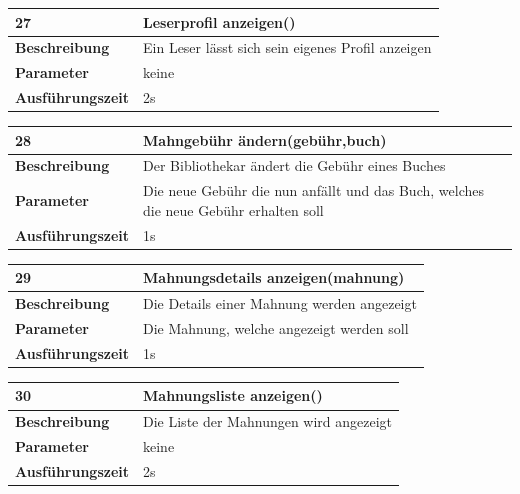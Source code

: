\documentclass[fontsize=12pt,paper=a4,twoside]{scrartcl}
\begin{document}
\begin{table}
	[H] \label{a27} 
	\begin{tabular}
		{|l|p{10cm}|} \hline \textbf{27} & \textbf{Leserprofil anzeigen()} \\
		\hline \textbf{Beschreibung} & Ein Leser lässt sich sein eigenes Profil anzeigen\\
		\hline \textbf{Parameter} & keine \\
		\hline \textbf{Ausführungszeit} & 2s\\
		\hline 
	\end{tabular}
\end{table}
\begin{table}
	[H] \label{a28} 
	\begin{tabular}
		{|l|p{10cm}|} \hline \textbf{28} & \textbf{Mahngebühr ändern(gebühr,buch)} \\
		\hline \textbf{Beschreibung} & Der Bibliothekar ändert die Gebühr eines Buches\\
		\hline \textbf{Parameter} & Die neue Gebühr die nun anfällt und das Buch, welches die neue Gebühr erhalten soll \\
		\hline \textbf{Ausführungszeit} & 1s\\
		\hline 
	\end{tabular}
\end{table}
\begin{table}
	[H] \label{a29} 
	\begin{tabular}
		{|l|p{10cm}|} \hline \textbf{29} & \textbf{Mahnungsdetails anzeigen(mahnung)} \\
		\hline \textbf{Beschreibung} & Die Details einer Mahnung werden angezeigt\\
		\hline \textbf{Parameter} & Die Mahnung, welche angezeigt werden soll \\
		\hline \textbf{Ausführungszeit} & 1s\\
		\hline 
	\end{tabular}
\end{table}
\begin{table}
	[H] \label{a30} 
	\begin{tabular}
		{|l|p{10cm}|} \hline \textbf{30} & \textbf{Mahnungsliste anzeigen()} \\
		\hline \textbf{Beschreibung} & Die Liste der Mahnungen wird angezeigt\\
		\hline \textbf{Parameter} & keine \\
		\hline \textbf{Ausführungszeit} & 2s\\
		\hline 
	\end{tabular}
\end{table}
\end{document}
